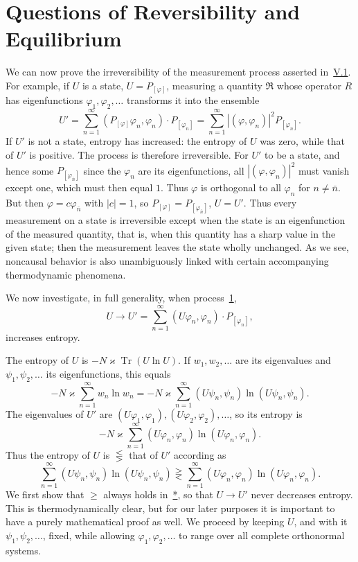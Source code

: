\documentclass[fontsize=13pt,twoside,openany,headings=normal,parskip=false,bookmarkpackage=false,DIV=calc]{scrbook}
\begin{document}
\section{Questions of Reversibility and Equilibrium}\label{sec:V.3}
We can now prove the irreversibility of the measurement process asserted in~\hyperref[sec:V.1]{V.1}. For example, if $U$ is a state, $U=P_{[\varphi]}$, measuring a quantity $\mathfrak R$ whose operator $R$ has eigenfunctions $\varphi_1,\varphi_2,\ldots$ transforms it into the ensemble
\[
U'=\sum_{n=1}^{\infty}(P_{[\varphi]}\varphi_n,\varphi_n)\cdot P_{[\varphi_n]}
=\sum_{n=1}^{\infty}|(\varphi,\varphi_n)|^2P_{[\varphi_n]}.
\]
If $U'$ is not a state, entropy has increased: the entropy of $U$ was zero, while that of $U'$ is positive. The process is therefore irreversible. For $U'$ to be a state, and hence some $P_{[\varphi_{\bar n}]}$ since the $\varphi_n$ are its eigenfunctions, all $|(\varphi,\varphi_n)|^2$ must vanish except one, which must then equal $1$. Thus $\varphi$ is orthogonal to all $\varphi_n$ for $n\ne\bar n$. But then $\varphi=c\varphi_{\bar n}$ with $|c|=1$, so $P_{[\varphi]}=P_{[\varphi_{\bar n}]}$, $U=U'$. Thus every measurement on a state is irreversible except when the state is an eigenfunction of the measured quantity, that is, when this quantity has a sharp value in the given state; then the measurement leaves the state wholly unchanged. As we see, noncausal behavior is also unambiguously linked with certain accompanying thermodynamic phenomena.

We now investigate, in full generality, when process~\hyperref[eq:V.1.1]{1},
\[
U\to U'=\sum_{n=1}^{\infty}(U\varphi_n,\varphi_n)\cdot P_{[\varphi_n]},
\]
increases entropy.

The entropy of $U$ is $-N\varkappa\operatorname{Tr}(U\ln U)$. If $w_1,w_2,\ldots$ are its eigenvalues and $\psi_1,\psi_2,\ldots$ its eigenfunctions, this equals
\[
-N\varkappa\sum_{n=1}^{\infty}w_n\ln w_n
=-N\varkappa\sum_{n=1}^{\infty}(U\psi_n,\psi_n)\ln(U\psi_n,\psi_n).
\]
The eigenvalues of $U'$ are $(U\varphi_1,\varphi_1),(U\varphi_2,\varphi_2),\ldots$, so its entropy is
\[
-N\varkappa\sum_{n=1}^{\infty}(U\varphi_n,\varphi_n)\ln(U\varphi_n,\varphi_n).
\]
Thus the entropy of $U$ is $\lesseqgtr$ that of $U'$ according as
\begin{equation}\tag{*}\label{eq:V.3.star}
\sum_{n=1}^{\infty}(U\psi_n,\psi_n)\ln(U\psi_n,\psi_n)
\gtreqless\sum_{n=1}^{\infty}(U\varphi_n,\varphi_n)\ln(U\varphi_n,\varphi_n).
\end{equation}
We first show that $\geq$ always holds in~\hyperref[eq:V.3.star]{*}, so that $U\to U'$ never decreases entropy. This is thermodynamically
\hypertarget{origpage-203}{}%
clear, but for our later purposes it is important to have a purely mathematical proof as well. We proceed by keeping $U$, and with it $\psi_1,\psi_2,\ldots$, fixed, while allowing $\varphi_1,\varphi_2,\ldots$ to range over all complete orthonormal systems.
\end{document}
